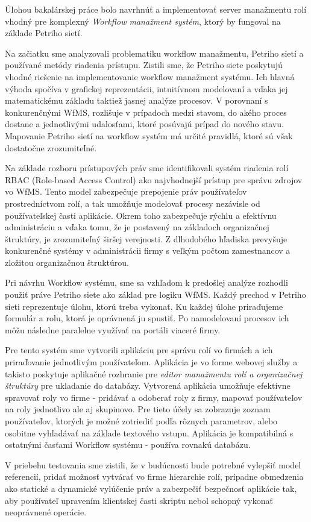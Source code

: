 Úlohou bakalárskej práce bolo navrhnúť a implementovať server manažmentu rolí vhodný pre komplexný \emph{Workflow manažment systém}, ktorý by fungoval na základe Petriho sietí.

\noindent Na začiatku sme analyzovali problematiku workflow manažmentu, Petriho sietí a používané metódy riadenia prístupu. Zistili sme, že Petriho siete poskytujú vhodné riešenie na implementovanie workflow manažment systému. Ich hlavná výhoda spočíva v grafickej reprezentácii, intuitívnom modelovaní a vďaka jej matematickému základu taktiež jasnej analýze procesov. V porovnaní s konkurenčnými WfMS, rozlišuje v prípadoch medzi stavom, do akého proces dostane a jednotlivými udalosťami, ktoré posúvajú prípad do nového stavu.  Mapovanie Petriho sietí na workflow systém má určité pravidlá, ktoré sú však dostatočne zrozumiteľné.

Na základe rozboru prístupových práv sme identifikovali systém riadenia rolí RBAC (Role-based Access Control) ako najvhodnejší prístup pre správu zdrojov vo WfMS. Tento model zabezpečuje prepojenie práv používateľov prostredníctvom rolí, a tak umožňuje modelovať procesy nezávisle od používateľskej časti aplikácie. Okrem toho zabezpečuje rýchlu a efektívnu administráciu a vďaka tomu, že je postavený na základoch organizačnej štruktúry, je zrozumiteľný širšej verejnosti. Z dlhodobého hľadiska prevyšuje konkurenčné systémy v administrácii firmy  s veľkým počtom zamestnancov a zložitou organizačnou štruktúrou. 

 
Pri návrhu Workflow systému, sme sa vzhľadom k predošlej analýze rozhodli použiť práve Petriho siete ako základ pre logiku WfMS. Každý prechod v Petriho sieti reprezentuje úlohu, ktorú treba vykonať. Ku každej úlohe priraďujeme formulár a rolu, ktorá je oprávnená ju spustiť. Po namodelovaní procesov  ich môžu následne paralelne využívať na portáli viaceré firmy. 

Pre tento systém sme vytvorili aplikáciu pre správu rolí vo firmách a ich  priraďovanie jednotlivým používateľom. Aplikácia je vo forme webovej služby a takisto poskytuje aplikačné rozhranie pre \emph{editor manažmentu rolí a organizačnej štruktúry} pre ukladanie do databázy. Vytvorená aplikácia umožňuje efektívne spravovať roly vo firme - pridávať a odoberať roly z firmy, mapovať používateľov na roly jednotlivo ale aj skupinovo. Pre tieto účely sa zobrazuje zoznam používateľov, ktorých je možné zotriediť podľa rôznych parametrov, alebo osobitne vyhľadávať na základe textového vstupu. Aplikácia je kompatibilná s ostatnými časťami Workflow systému - používa rovnakú databázu. 


V priebehu testovania sme zistili, že v budúcnosti bude  potrebné vylepšiť model referencií, pridať možnosť vytvárať vo firme hierarchie rolí, prípadne obmedzenia ako statické a dynamické vylúčenie práv  a zabezpečiť bezpečnosť aplikácie tak, aby používateľ upravením klientskej časti skriptu nebol schopný vykonať neoprávnené operácie. 









